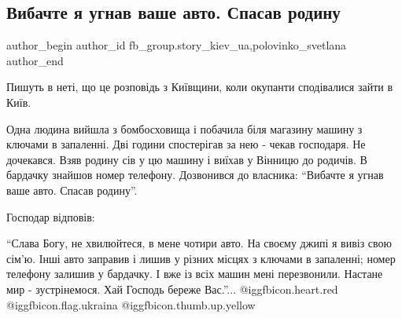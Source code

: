  
 
 
 
 
 
\subsection{Вибачте я угнав ваше авто. Спасав родину}
\label{sec:01_05_2022.fb.fb_group.story_kiev_ua.1.ugon_avto}
 
\ifcmt
 author_begin
   author_id fb_group.story_kiev_ua,polovinko_svetlana
 author_end
\fi


Пишуть в неті, що це розповідь з Київщини, коли окупанти сподівалися зайти в
Київ.


Одна людина вийшла з бомбосховища і побачила біля магазину машину з ключами в
запаленні. Дві години спостерігав за нею - чекав господаря. Не дочекався. Взяв
родину сів у цю машину і виїхав у Вінницю до родичів. В бардачку знайшов номер
телефону. Дозвонився до власника: \enquote{Вибачте я угнав ваше авто. Спасав
родину}.

Господар відповів:

\enquote{Слава Богу, не хвилюйтеся, в мене чотири авто. На своєму джипі я вивіз
свою сім'ю. Інші авто заправив і лишив у різних місцях з ключами в запаленні;
номер телефону залишив у бардачку. І вже із всіх машин мені перезвонили.
Настане мир - зустрінемося. Хай Господь береже Вас.}... @igg{fbicon.heart.red}
@igg{fbicon.flag.ukraina} @igg{fbicon.thumb.up.yellow}


\clearpage
{}
